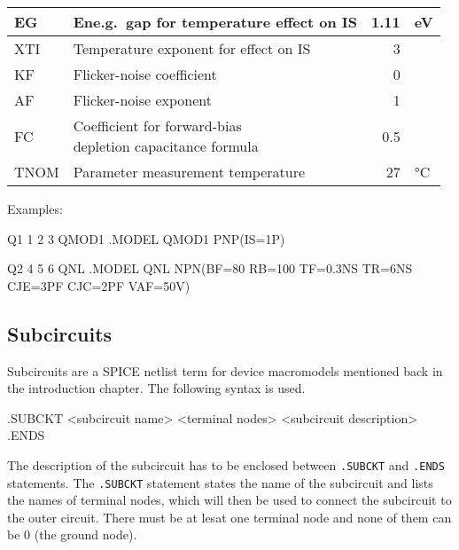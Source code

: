 \begin{center}
\begin{longtable}{|l|l|r l|}
\color{lightgray}	EG	&	\color{lightgray}	Ene.g.\ gap for temperature  effect on IS 	&	\color{lightgray}	1.11    &	\color{lightgray}	eV 	 \\ \hline
\color{lightgray}	XTI	&	\color{lightgray}	Temperature exponent for effect on IS 	&	\color{lightgray}	3 	&	\color{lightgray}   	 	 \\ \hline
\color{lightgray}	KF 	&	\color{lightgray}	Flicker-noise coefficient 	&	\color{lightgray}	0 	&	\color{lightgray}   	 	 \\ \hline
\color{lightgray}	AF 	&	\color{lightgray}	Flicker-noise exponent 	&	\color{lightgray}	1 	&	\color{lightgray}   	 	 \\ \hline
FC 	&		\makecell[l]{Coefficient for forward-bias \\ depletion capacitance formula} 	&		0.5 	&	   	 	 \\ \hline

TNOM 	&	Parameter measurement temperature 	&	27  &	°C 	 \\ \hline


	\end{longtable}
\end{center}

Examples:

\begin{code}
Q1 1 2 3 QMOD1
.MODEL QMOD1 PNP(IS=1P)

Q2 4 5 6 QNL
.MODEL QNL NPN(BF=80 RB=100 TF=0.3NS TR=6NS CJE=3PF CJC=2PF VAF=50V)
\end{code}

\subsection{Subcircuits}
\label{chap:spicecode:subcircuits}
Subcircuits are a SPICE netlist term for device macromodels mentioned back in the introduction chapter. The following syntax is used.

\begin{code}
.SUBCKT <subcircuit name> <terminal nodes>
<subcircuit description>
.ENDS
\end{code}

The description of the subcircuit has to be enclosed between \texttt{.SUBCKT} and \texttt{.ENDS} statements. The \texttt{.SUBCKT} statement states the name of the subcircuit and lists the names of terminal nodes, which will then be used to connect the subcircuit to the outer circuit. There must be at lesat one terminal node and none of them can be 0 (the ground node).


